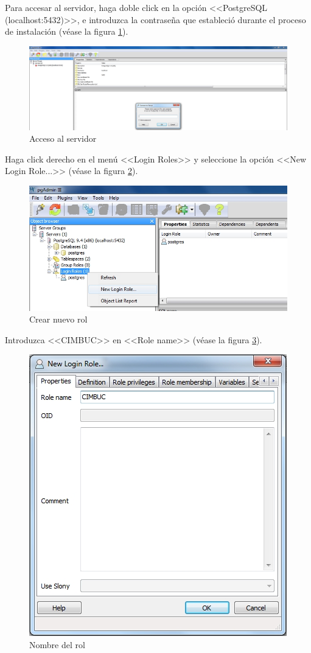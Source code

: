 Para accesar al servidor, haga doble click en la opci\'{o}n <<PostgreSQL (localhost:5432)>>, e introduzca la contrase\~{n}a que estableci\'{o} durante el proceso de instalaci\'{o}n (v\'{e}ase la figura \ref{fig:pgadmin-acceso}).

\begin{figure}[H]
  \centering
  \includegraphics[width=1\linewidth]{./img/pgadmin-acceso.jpg}
\caption[]{Acceso al servidor\label{fig:pgadmin-acceso}}
\end{figure}

\newpage

Haga click derecho en el men\'{u} <<Login Roles>> y seleccione la opci\'{o}n <<New Login Role...>> (v\'{e}ase la figura \ref{fig:pgadmin-rol}).

\begin{figure}[H]
  \centering
  \includegraphics[width=1\linewidth]{./img/pgadmin-rol.jpg}
\caption[]{Crear nuevo rol\label{fig:pgadmin-rol}}
\end{figure}

Introduzca <<CIMBUC>> en <<Role name>> (v\'{e}ase la figura \ref{fig:pgadmin-rol-nombre}).

\begin{figure}[H]
  \centering
  \includegraphics[width=.5\linewidth]{./img/pgadmin-rol-nombre.jpg}
\caption[]{Nombre del rol\label{fig:pgadmin-rol-nombre}}
\end{figure}

